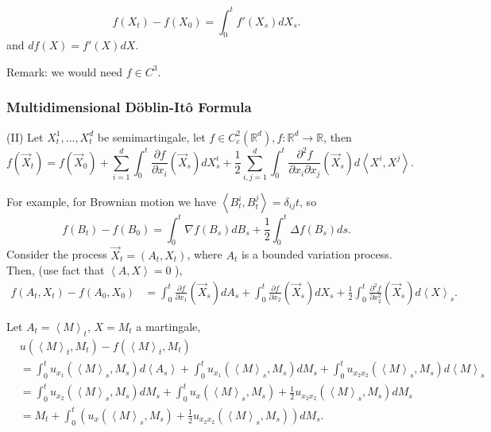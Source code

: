 \begin{proposition}
	\[
		f(X_t) - f(X_0) = \int _0^t f'(X_s) d X_s
	.\] 
	and $d f(X) = f'(X)  d X$.
\end{proposition}
Remark: we would need $f \in C^3$.

\subsubsection{Multidimensional D\"oblin-Itô Formula}

\begin{theorem} (II)
	Let $X_t^1, \ldots, X_t^d$ be semimartingale, let $f \in C_c^2(\mathbb{R}^d), f : \mathbb{R}^d \to  \mathbb{R}$, then
	\[
		f(\vec{X} _t) = 
		f(\vec{X} _0) 
		+ \sum_{i=1}^{d} \int _0^t \frac{\partial f}{\partial x_i} (\vec{X} _s) d X_s^i
		+ \frac{1}{2}\sum_{i, j=1}^{d} \int _0^t \frac{\partial^2 f}{\partial x_i \partial x_j} (\vec{X} _s) d \left\langle X^i, X^j \right\rangle 
	.\] 
	
\end{theorem}

For example, for Brownian motion we have $\left\langle B_t^i, B_t^j \right\rangle  = \delta_{i j}t$, so
\[
	f(B_t) - f(B_0) = \int _0^t \nabla f(B_s) d B_s + \frac{1}{2}\int _0^t \Delta f(B_s) d s
.\] 
Consider the process $\vec{X} _t = (A_t, X_t)$, where $A_t$ is a bounded variation process. Then, (use fact that $\left\langle A, X \right\rangle  = 0$ ),
\begin{align*}
	f(A_t, X_t) - f(A_0, X_0) 
	&= \int _0^t \frac{\partial f}{\partial x_1} (\vec{X} _s) d A_s 
	+ \int _0^t \frac{\partial f}{\partial x_2} (\vec{X} _s) d X_s
	+ \frac{1}{2} \int _0^t \frac{\partial ^2 f}{\partial x_2^2} (\vec{X} _s) d \left\langle X \right\rangle _s
.\end{align*} 

Let $A_t = \left\langle M \right\rangle _t$, $X = M_t$ a martingale,
\begin{align*}
	&u\left( \left\langle M \right\rangle _t, M_t \right)  - f\left( \left\langle M \right\rangle _t, M_t \right) \\
	&= \int _0^t u_{x_1}\left( \left\langle M \right\rangle _s, M_s \right)  d \left\langle A_s \right\rangle 
	+ \int _0^t u_{x_1} \left( \left\langle M \right\rangle _s, M_s \right)  d M_s
	+ \int _0^t u_{x_2 x_2} \left( \left\langle M \right\rangle _s, M_s \right)  d \left\langle M \right\rangle _s\\
	&=  \int _0^t u_{x_2}\left( \left\langle M \right\rangle _s, M_s \right)  d M_s 
	+ \int _0^t u_x\left( \left\langle M \right\rangle _s,  M_s \right)  + \frac{1}{2} u_{x_2 x_2} \left( \left\langle M \right\rangle _s, M_s \right)  d M_s\\
	&=  M_t + \int _0^t \left( u_x\left( \left\langle M \right\rangle _s, M_s \right) + \frac{1}{2} u_{x_2 x_2} \left( \left\langle M \right\rangle _s, M_s \right)  \right)  d M_s
.\end{align*} 

